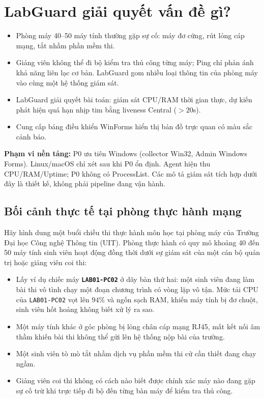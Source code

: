 \documentclass[12pt,a4paper]{article}
\begin{document}
\section{LabGuard giải quyết vấn đề gì?}

\begin{summarybox}
\begin{itemize}[leftmargin=1.5em, itemsep=1pt]
  \item Phòng máy 40--50 máy tính thường gặp sự cố: máy đơ cứng, rút lỏng cáp mạng, tắt nhầm phần mềm thi.
  \item Giảng viên không thể đi bộ kiểm tra thủ công từng máy; Ping chỉ phản ánh khả năng liên lạc cơ bản. LabGuard gom nhiều loại thông tin của phòng máy vào cùng một hệ thống giám sát.
  \item LabGuard giải quyết bài toán: giám sát CPU/RAM thời gian thực, dự kiến phát hiện quá hạn nhịp tim bằng liveness Central ($>20$s).
  \item Cung cấp bảng điều khiển WinForms hiển thị bản đồ trực quan có màu sắc cảnh báo.
\end{itemize}
\end{summarybox}

\textbf{Phạm vi nền tảng:} P0 ưu tiên Windows (collector Win32, Admin Windows Forms). Linux/macOS chỉ xét sau khi P0 ổn định. Agent hiện thu CPU/RAM/Uptime; P0 không có ProcessList. Các mô tả giám sát tích hợp dưới đây là thiết kế, không phải pipeline đang vận hành.

\subsection{Bối cảnh thực tế tại phòng thực hành mạng}
Hãy hình dung một buổi chiều thi thực hành môn học tại phòng máy của Trường Đại học Công nghệ Thông tin (UIT). Phòng thực hành có quy mô khoảng 40 đến 50 máy tính sinh viên hoạt động đồng thời dưới sự giám sát của một cán bộ quản trị hoặc giảng viên coi thi:
\begin{itemize}
  \item Lấy ví dụ chiếc máy \textbf{\texttt{LAB01-PC02}} ở dãy bàn thứ hai: một sinh viên đang làm bài thi vô tình chạy một đoạn chương trình có vòng lặp vô tận. Mức tải CPU của \texttt{LAB01-PC02} vọt lên $94\%$ và ngốn sạch RAM, khiến máy tính bị đơ chuột, sinh viên hốt hoảng không biết xử lý ra sao.
  \item Một máy tính khác ở góc phòng bị lỏng chân cáp mạng RJ45, mất kết nối âm thầm khiến bài thi không thể gửi lên hệ thống nộp bài của trường.
  \item Một sinh viên tò mò tắt nhầm dịch vụ phần mềm thi cử cần thiết đang chạy ngầm.
  \item Giảng viên coi thi không có cách nào biết được chính xác máy nào đang gặp sự cố trừ khi trực tiếp đi bộ đến từng bàn máy để kiểm tra thủ công.
\end{itemize}
\end{document}
